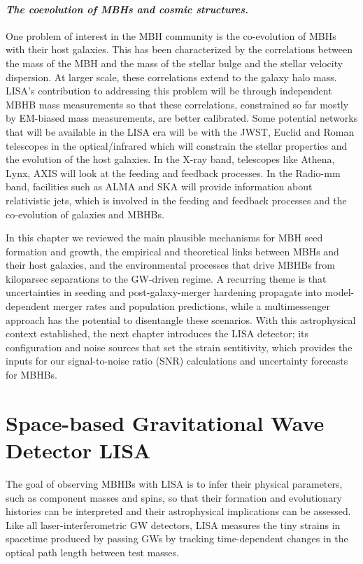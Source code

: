 \documentclass[a4paper,12pt]{article}
\begin{document}
\paragraph{\normalfont\textit{The coevolution of MBHs and cosmic structures.}}
One problem of interest in the MBH community is the co-evolution of MBHs with their host galaxies. This has been characterized by the correlations between the mass of the MBH and the mass of the stellar bulge and the stellar velocity dispersion. At larger scale, these correlations extend to the galaxy halo mass. LISA's contribution to addressing this problem will be through independent MBHB mass measurements so that these correlations, constrained so far mostly by EM-biased mass measurements, are better calibrated. Some potential networks that will be available in the LISA era will be with the JWST, Euclid and Roman telescopes in the optical/infrared which will constrain the stellar properties and the evolution of the host galaxies. In the X-ray band, telescopes like Athena, Lynx, AXIS will look at the feeding and feedback processes. In the Radio-mm band, facilities such as ALMA and SKA will provide information about relativistic jets, which is involved in the feeding and feedback processes and the co-evolution of galaxies and MBHBs.

In this chapter we reviewed the main plausible mechanisms for MBH seed formation and growth, the empirical and theoretical links between MBHs and their host galaxies, and the environmental processes that drive MBHBs from kiloparsec separations to the GW-driven regime. A recurring theme is that uncertainties in seeding and post-galaxy-merger hardening propagate into model-dependent merger rates and population predictions, while a multimessenger approach has the potential to disentangle these scenarios. With this astrophysical context established, the next chapter introduces the LISA detector; its configuration and noise sources that set the strain sentitivity, which provides the inputs for our signal-to-noise ratio (SNR) calculations and uncertainty forecasts for MBHBs.

\section{Space-based Gravitational Wave Detector LISA}
\label{sec:LISA}

The goal of observing MBHBs with LISA is to infer their physical parameters, such as component masses and spins, so that their formation and evolutionary histories can be interpreted and their astrophysical implications can be assessed. Like all laser-interferometric GW detectors, LISA measures the tiny strains in spacetime produced by passing GWs by tracking time-dependent changes in the optical path length between test masses\cite{bond2016interferometer,amaro2017laser}.
\end{document}
